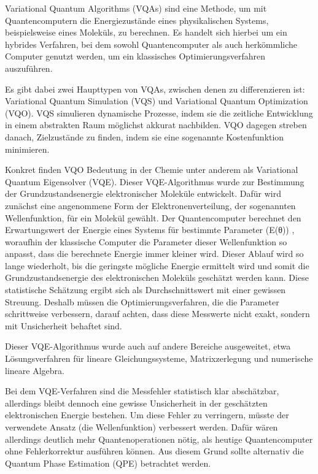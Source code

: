 Variational Quantum Algorithms (VQAs) sind eine Methode, um mit Quantencomputern die Energiezustände eines physikalischen Systems, beispielsweise eines Moleküls, zu berechnen. Es handelt sich hierbei um ein hybrides Verfahren, bei dem sowohl Quantencomputer als auch herkömmliche Computer genutzt werden, um ein klassisches Optimierungsverfahren auszuführen. \citealp[6]{weidmanQuantumComputingChemistry2024a}

Es gibt dabei zwei Haupttypen von VQAs, zwischen denen zu differenzieren ist: Variational Quantum Simulation (VQS) und Variational Quantum Optimization (VQO). VQS simulieren dynamische Prozesse, indem sie die zeitliche Entwicklung in einem abstrakten Raum möglichst akkurat nachbilden. VQO dagegen streben danach, Zielzustände zu finden, indem sie eine sogenannte Kostenfunktion minimieren. \citealp[23]{mottaEmergingQuantumComputing2022}

Konkret finden VQO Bedeutung in der Chemie unter anderem als Variational Quantum Eigensolver (VQE). Dieser VQE-Algorithmus wurde zur Bestimmung der Grundzustandsenergie elektronischer Moleküle entwickelt. Dafür wird zunächst eine angenommene Form der Elektronenverteilung, der sogenannten Wellenfunktion, für ein Molekül gewählt. Der Quantencomputer berechnet den Erwartungswert der Energie eines Systems für bestimmte Parameter (E(θ)) \citealp[23]{mottaEmergingQuantumComputing2022}, woraufhin der klassische Computer die Parameter dieser Wellenfunktion so anpasst, dass die berechnete Energie immer kleiner wird. Dieser Ablauf wird so lange wiederholt, bis die geringste mögliche Energie ermittelt wird und somit die Grundzustandsenergie des elektronischen Moleküls geschätzt werden kann. \citealp[6]{weidmanQuantumComputingChemistry2024a}
Diese statistische Schätzung ergibt sich als Durchschnittswert mit einer gewissen Streuung. Deshalb müssen die Optimierungsverfahren, die die Parameter schrittweise verbessern, darauf achten, dass diese Messwerte nicht exakt, sondern mit Unsicherheit behaftet sind. \citealp[23]{mottaEmergingQuantumComputing2022}

Dieser VQE-Algorithmus wurde auch auf andere Bereiche ausgeweitet, etwa Lösungsverfahren für lineare Gleichungssysteme, Matrixzerlegung und numerische lineare Algebra. \citealp[6]{weidmanQuantumComputingChemistry2024a}

Bei dem VQE-Verfahren sind die Messfehler statistisch klar abschätzbar, allerdings bleibt dennoch eine gewisse Unsicherheit in der geschätzten elektronischen Energie bestehen. Um diese Fehler zu verringern, müsste der verwendete Ansatz (die Wellenfunktion) verbessert werden. Dafür wären allerdings deutlich mehr Quantenoperationen nötig, als heutige Quantencomputer ohne Fehlerkorrektur ausführen können. Aus diesem Grund sollte alternativ die Quantum Phase Estimation (QPE) betrachtet werden. \citealp[7]{vonburgQuantumComputingEnhanced2021}



